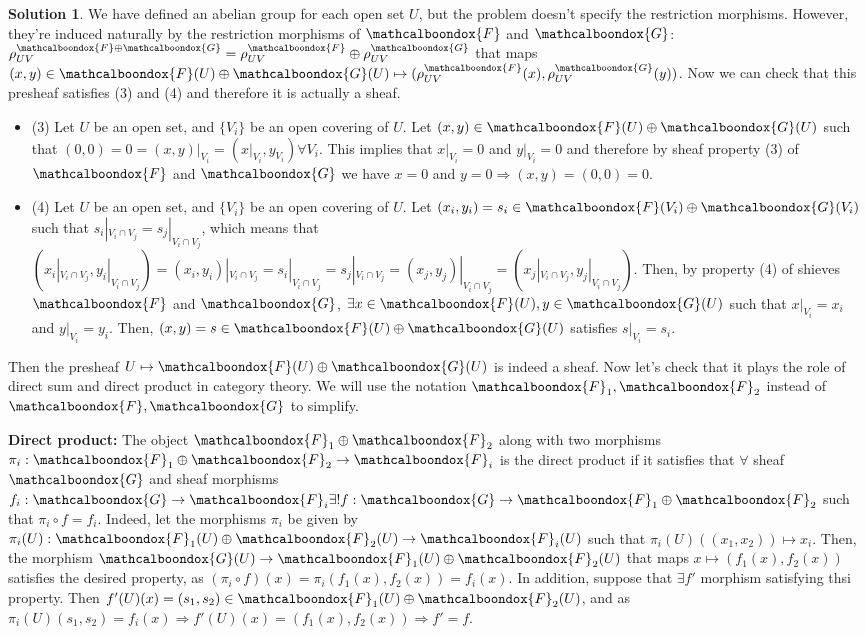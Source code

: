 \documentclass[12pt]{article}
\newcommand{\imp}{\ensuremath{\Rightarrow}}
\theoremstyle{definition}
\newtheorem*{sol}{Solution}
\newcommand{\sF}{\ensuremath{\mathcalboondox{F}}}
\newcommand{\sG}{\ensuremath{\mathcalboondox{G}}}
\begin{document}
\begin{sol}
	We have defined an abelian group for each open set $U$, but the problem doesn't specify the restriction morphisms. However, they're induced naturally by the restriction morphisms of $\sF$ and $\sG$: $\rho_{UV}^{\sF \oplus \sG} = \rho_{UV}^{\sF} \oplus \rho_{UV}^{\sG}$ that maps $(x,y) \in \sF(U) \oplus \sG(U) \mapsto (\rho_{UV}^{\sF}(x), \rho_{UV}^{\sG}(y))$. Now we can check that this presheaf satisfies (3) and (4) and therefore it is actually a sheaf.
	\begin{itemize}
		\item (3) Let $U$ be an open set, and $\{V_i\}$ be an open covering of $U$. Let $(x,y) \in \sF(U) \oplus \sG(U)$ such that $(0,0) = 0 = (x,y)|_{V_i} = (x|_{V_i}, y_{V_i}) \forall V_i$. This implies that $x|_{V_i} = 0$ and $y|_{V_i} = 0$ and therefore by sheaf property (3) of $\sF$ and $\sG$ we have $x = 0$ and $y = 0 \imp (x,y) = (0,0) = 0$.

		\item (4) Let $U$ be an open set, and $\{V_i\}$ be an open covering of $U$. Let $(x_i, y_i) = s_i \in \sF(V_i) \oplus \sG(V_i)$ such that $s_i|_{V_i \cap V_j} = s_j|_{V_i \cap V_j}$, which means that $(x_i|_{V_i \cap V_j}, y_i|_{V_i \cap V_j}) = (x_i,y_i)|_{V_i \cap V_j} = s_i|_{V_i \cap V_j} = s_j|_{V_i \cap V_j} = (x_j,y_j)|_{V_i \cap V_j} = (x_j|_{V_i \cap V_j}, y_j|_{V_i \cap V_j})$. Then, by property (4) of shieves $\sF$ and $\sG$, $\exists x \in \sF(U), y \in \sG(U)$ such that $x|_{V_i} = x_i$ and $y|_{V_i} = y_i$. Then, $(x,y) = s \in \sF(U) \oplus \sG(U)$ satisfies $s|_{V_i} = s_i$.
	\end{itemize}

	Then the presheaf $U \mapsto \sF(U) \oplus \sG(U)$ is indeed a sheaf. Now let's check that it plays the role of direct sum and direct product in category theory. We will use the notation $\sF_1, \sF_2$ instead of $\sF, \sG$ to simplify.

	\textbf{Direct product:} The object $\sF_1 \oplus \sF_2$ along with two morphisms $\pi_i: \sF_1 \oplus \sF_2 \to \sF_i$ is the direct product if it satisfies that $\forall$ sheaf $\sG$ and sheaf morphisms $f_i: \sG \to \sF_i \exists ! f: \sG \to \sF_1 \oplus \sF_2$ such that $\pi_i \circ f = f_i$. Indeed, let the morphisms $\pi_i$ be given by $\pi_i(U): \sF_1(U) \oplus \sF_2(U) \to \sF_i(U)$ such that $\pi_i(U)((x_1,x_2)) \mapsto x_i$. Then, the morphism $\sG(U) \to \sF_1(U) \oplus \sF_2(U)$ that maps $x \mapsto (f_1(x), f_2(x))$ satisfies the desired property, as $(\pi_i \circ f)(x) = \pi_i(f_1(x), f_2(x)) = f_i(x)$. In addition, suppose that $\exists f'$ morphism satisfying thsi property. Then $f'(U)(x) = (s_1,s_2) \in \sF_1(U) \oplus \sF_2(U)$, and as $\pi_i(U)(s_1,s_2) = f_i(x) \imp f'(U)(x) = (f_1(x),f_2(x)) \imp f' = f$.


\end{sol}
\end{document}
